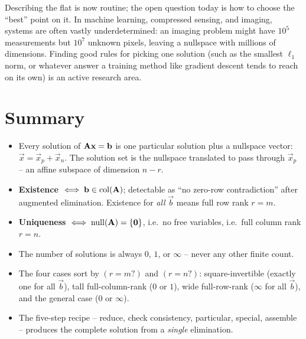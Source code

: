\begin{historybox}
Describing the flat is now routine; the open question today is how to choose the ``best''
point on it. In machine learning, compressed sensing, and imaging, systems are often vastly
underdetermined: an imaging problem might have $10^5$ measurements but $10^7$ unknown pixels,
leaving a nullspace with millions of dimensions. Finding good rules for picking one solution
(such as the smallest $\ell_1$ norm, or whatever answer a training method like gradient
descent tends to reach on its own) is an active research area.
\end{historybox}

\section{Summary}

\begin{itemize}
  \item Every solution of $\mathbf{A}\mathbf{x}=\mathbf{b}$ is one particular solution plus a
    nullspace vector: $\vec{x}=\vec{x}_p+\vec{x}_n$. The solution set is the nullspace
    translated to pass through $\vec{x}_p$ -- an affine subspace of dimension $n-r$.
  \item \textbf{Existence} $\iff \mathbf{b}\in\operatorname{col}(\mathbf{A})$; detectable as ``no zero-row
    contradiction'' after augmented elimination. Existence for \emph{all} $\vec{b}$ means
    full row rank $r=m$.
  \item \textbf{Uniqueness} $\iff \operatorname{null}(\mathbf{A})=\{\mathbf{0}\}$, i.e.\ no free variables,
    i.e.\ full column rank $r=n$.
  \item The number of solutions is always $0$, $1$, or $\infty$ -- never any other finite
    count.
  \item The four cases sort by $(r=m?)$ and $(r=n?)$: square-invertible (exactly one for
    all $\vec b$), tall full-column-rank ($0$ or $1$), wide full-row-rank ($\infty$ for
    all $\vec b$), and the general case ($0$ or $\infty$).
  \item The five-step recipe -- reduce, check consistency, particular, special, assemble --
    produces the complete solution from a \emph{single} elimination.
\end{itemize}

